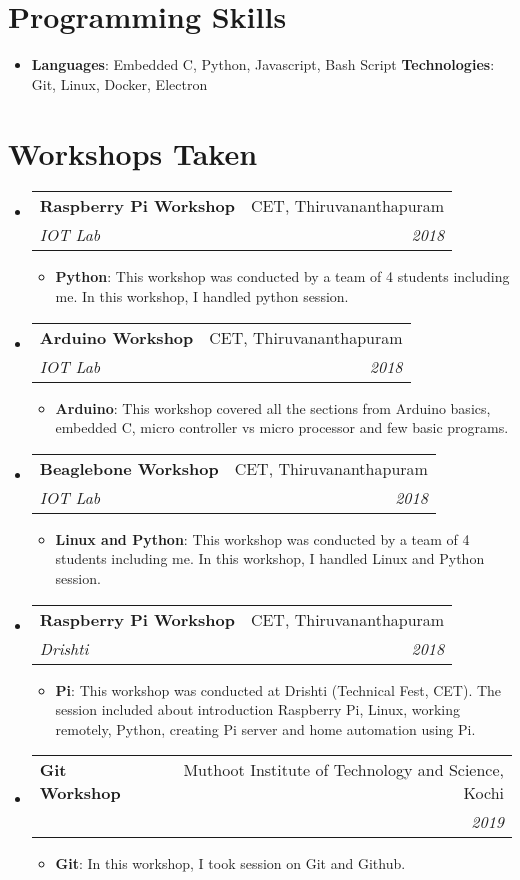 \documentclass[letterpaper,11pt]{article}
\makeatletter
\newcommand{\resumeItem}[2]{
  \item\small{
    \textbf{#1}{: #2 \vspace{-2pt}}
  }
}
\newcommand{\resumeSubheading}[4]{
  \vspace{-1pt}\item
    \begin{tabular*}{0.97\textwidth}[t]{l@{\extracolsep{\fill}}r}
      \textbf{#1} & #2 \\
      \textit{\small#3} & \textit{\small #4} \\
    \end{tabular*}\vspace{-5pt}
}
\newcommand{\resumeSubHeadingListStart}{\begin{itemize}[leftmargin=*]}
\newcommand{\resumeSubHeadingListEnd}{\end{itemize}}
\newcommand{\resumeItemListStart}{\begin{itemize}}
\newcommand{\resumeItemListEnd}{\end{itemize}\vspace{-5pt}}
\makeatother
\begin{document}
\section{Programming Skills}
  \resumeSubHeadingListStart
    \item{
      \textbf{Languages}{: Embedded C, Python, Javascript, Bash Script }
      \hfill
      \textbf{Technologies}{: Git, Linux, Docker, Electron }
    }
  \resumeSubHeadingListEnd

\section{Workshops Taken}
  \resumeSubHeadingListStart
    \resumeSubheading
      {Raspberry Pi Workshop}{CET, Thiruvananthapuram}
      {IOT Lab}{2018}
      \resumeItemListStart
        \resumeItem{Python}
          {This workshop was conducted by a team of 4 students including me. In this workshop, I handled python session.}
      \resumeItemListEnd
      \resumeSubheading
      {Arduino Workshop}{CET, Thiruvananthapuram}
      {IOT Lab}{2018}
      \resumeItemListStart
        \resumeItem{Arduino}
          {This workshop covered all the sections from Arduino basics, embedded C, micro controller vs micro processor and few basic programs.}
      \resumeItemListEnd
      
      \resumeSubheading
      {Beaglebone Workshop}{CET, Thiruvananthapuram}
      {IOT Lab}{2018}
      \resumeItemListStart
        \resumeItem{Linux and Python}
          {This workshop was conducted by a team of 4 students including me. In this workshop, I handled Linux and Python session.}
      \resumeItemListEnd
      
      \resumeSubheading
      {Raspberry Pi Workshop}{CET, Thiruvananthapuram}
      {Drishti}{2018}
      \resumeItemListStart
        \resumeItem{Pi}
          {This workshop was conducted at Drishti (Technical Fest, CET). The session included about introduction Raspberry Pi, Linux, working remotely, Python, creating Pi server and home automation using Pi.}
      \resumeItemListEnd
      
      \resumeSubheading
      {Git Workshop}{Muthoot Institute of Technology and Science, Kochi}
      {}{2019}
      \resumeItemListStart
        \resumeItem{Git}
          {In this workshop, I took session on Git and Github.}
      \resumeItemListEnd
      
  \resumeSubHeadingListEnd
\end{document}
